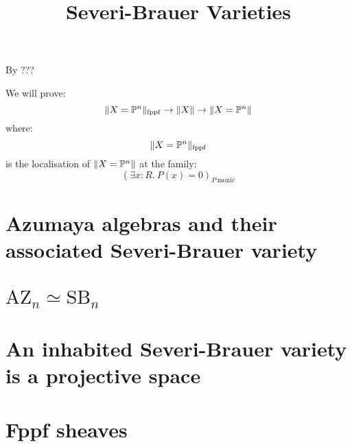 \documentclass{../util/zariski}
\title{Severi-Brauer Varieties}
\newcommand{\SB}{\mathrm{SB}}
\newcommand{\AZ}{\mathrm{AZ}}
\begin{document}
\maketitle

By ???

We will prove:
\[\lVert X=\mathbb{P}^n \rVert_{\mathrm{fppf}} \to \lVert X \rVert \to \lVert X=\mathbb{P}^n \rVert\]
where:
\[\lVert X=\mathbb{P}^n \rVert_{\mathrm{fppf}}\]
is the localisation of $\lVert X=\mathbb{P}^n \rVert$ at the family: 
\[(\exists x:R.\ P(x)=0)_{P\ \mathrm{monic}}\]
\tableofcontents

\section{Azumaya algebras and their associated Severi-Brauer variety}


\section{$\AZ_n\simeq \SB_n$}


\section{An inhabited Severi-Brauer variety is a projective space}


\section{Fppf sheaves}


\printindex

\printbibliography
\end{document}
